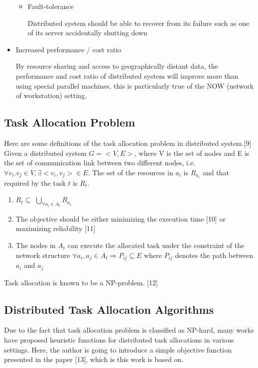 \begin{itemize}
\begin{itemize}
      	\item{Fault-tolerance}
	
	Distributed system should be able to recover from its failure such as one of its server accidentally shutting down
	
    \end{itemize}
    
    
   \item{Increased performance / cost ratio}
   
     By resource sharing and access to geographically distant data, the performance and cost ratio of distributed system will improve more than using special parallel machines, this is particularly true of the NOW (network of workstation) setting.
     
\end{itemize}

\subsection{Task Allocation Problem}

Here are some definitions of the task allocation problem in distributed system.[9]
Given a distributed system $G = <V, E>$, where V is the set of nodes and E is the set of communication link between two different nodes, i.e. $\forall v_i. v_j \in V, \exists <v_i, v_j> \in E$.  The set of the resources in $a_i$ is $R_{a_i}$ and that required by the task $t$ is $R_t$.

\begin{enumerate}
	\item{$R_t \subseteq$ $\bigcup_{\forall a_i \in A_t} R_{a_i}$}
	\item{The objective should be either minimizing the execution time [10] or maximizing reliability [11]}
	\item{The nodes in $A_t$ can execute the allocated task under the constraint of the network structure $\forall a_i, a_j \in A_t \Rightarrow P_{ij} \subseteq E$ where $P_{ij}$ denotes the path between $a_i$ and $a_j$}
\end{enumerate}

Task allocation is known to be a NP-problem. [12]

\subsection{Distributed Task Allocation Algorithms}

Due to the fact that task allocation problem is classified as NP-hard, many works have proposed heuristic functions for distributed task allocations in various settings.  Here, the author is going to introduce a simple objective function presented in the paper [13], which is this work is based on.

